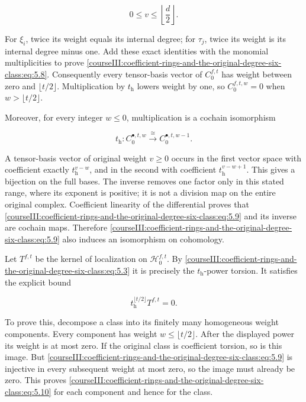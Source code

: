 \begin{equation}
0\leq v\leq\left\lfloor\frac d2\right\rfloor .
 \label{courseIII:coefficient-rings-and-the-original-degree-six-class:eq:5.8}
\end{equation}

For \(\xi_i\), twice its weight equals its internal degree; for \(\tau_j\), twice its weight is its internal degree minus one. Add these exact identities with the monomial multiplicities to prove \eqref{courseIII:coefficient-rings-and-the-original-degree-six-class:eq:5.8}. Consequently every tensor-basis vector of \(C_0^{f,t}\) has weight between zero and \(\lfloor t/2\rfloor\). Multiplication by \(t_{\mathrm h}\) lowers weight by one, so \(C_0^{f,t,w}=0\) when \(w>\lfloor t/2\rfloor\).

Moreover, for every integer \(w\leq0\), multiplication is a cochain isomorphism

\begin{equation}
t_{\mathrm h}:C_0^{\bullet,t,w}
                  \xrightarrow{\ \cong\ }C_0^{\bullet,t,w-1}.
 \label{courseIII:coefficient-rings-and-the-original-degree-six-class:eq:5.9}
\end{equation}

A tensor-basis vector of original weight \(v\geq0\) occurs in the first vector space with coefficient exactly \(t_{\mathrm h}^{v-w}\), and in the second with coefficient \(t_{\mathrm h}^{v-w+1}\). This gives a bijection on the full bases. The inverse removes one factor only in this stated range, where its exponent is positive; it is not a division map on the entire original complex. Coefficient linearity of the differential proves that \eqref{courseIII:coefficient-rings-and-the-original-degree-six-class:eq:5.9} and its inverse are cochain maps. Therefore \eqref{courseIII:coefficient-rings-and-the-original-degree-six-class:eq:5.9} also induces an isomorphism on cohomology.

Let \(T^{f,t}\) be the kernel of localization on \(\mathcal H_0^{f,t}\). By \eqref{courseIII:coefficient-rings-and-the-original-degree-six-class:eq:5.3} it is precisely the \(t_{\mathrm h}\)-power torsion. It satisfies the explicit bound

\begin{equation}
t_{\mathrm h}^{\lfloor t/2\rfloor}T^{f,t}=0.
 \label{courseIII:coefficient-rings-and-the-original-degree-six-class:eq:5.10}
\end{equation}

To prove this, decompose a class into its finitely many homogeneous weight components. Every component has weight \(w\leq\lfloor t/2\rfloor\). After the displayed power its weight is at most zero. If the original class is coefficient torsion, so is this image. But \eqref{courseIII:coefficient-rings-and-the-original-degree-six-class:eq:5.9} is injective in every subsequent weight at most zero, so the image must already be zero. This proves \eqref{courseIII:coefficient-rings-and-the-original-degree-six-class:eq:5.10} for each component and hence for the class.

